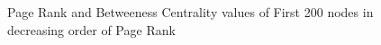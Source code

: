 \documentclass{article}
\begin{document}
\begin{enumerate}
\begin{figure}[!hbtp]
\hfill
{}
\hfill
{}
\hfill
{}
\hfill
\caption{
\label{case1rankplotPR}%
Page Rank and Betweeness Centrality values of First 200 nodes in decreasing order of Page Rank}
\end{figure}


\end{enumerate}
\end{document}
